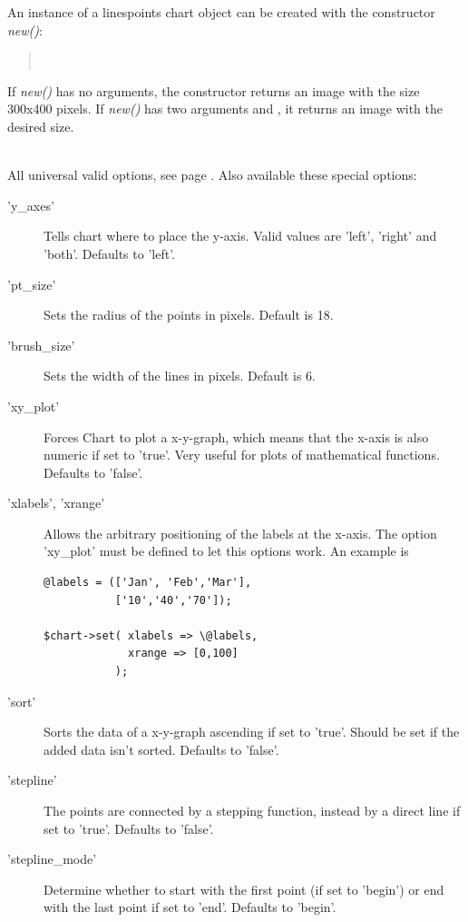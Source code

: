 \begin{Constructor} 
An instance of a linespoints chart object can be created with the constructor 
\textit{new()}:
\begin{quote}
\parindent 0pt
\\
\end{quote}

If \textit{new()} has no arguments, the constructor returns an image with the size 300x400 pixels.
If \textit{new()} has two arguments  and , 
it returns an image with the desired size.
\end{Constructor}

\Methods
{} \\[\parabstand]
%
\Attributes
All universal valid options, see page \pageref{options}. 
Also available these special options:
\begin{description}
\item['y\_axes'] Tells chart where to place the y-axis. 
     Valid values are 'left', 'right' and 'both'. Defaults to 'left'.

\item['pt\_size'] Sets the radius of the points in pixels. Default is 18.

\item['brush\_size'] Sets the width of the lines in pixels. Default is 6.

\item['xy\_plot'] Forces Chart to plot a x-y-graph, 
                  which means that the x-axis is also numeric if set to 'true'. 
                  Very useful for plots of mathematical functions. Defaults to 'false'.

\item['xlabels', 'xrange'] Allows the arbitrary positioning of the labels at the
                  x-axis. The option 'xy\_plot' must be defined to let this
                  options work. An example is
                  \begin{verbatim}
@labels = (['Jan', 'Feb','Mar'], 
           ['10','40','70']); 

$chart->set( xlabels => \@labels, 
             xrange => [0,100] 
           ); 
                   \end{verbatim}

\item['sort'] Sorts the data of a x-y-graph ascending if set to 'true'. 
              Should be set if the added data isn't sorted. Defaults to 'false'.  
              
\item['stepline'] The points are connected by a stepping function,
                  instead by a direct line if set to 'true'. 
                  Defaults to 'false'.   

\item['stepline\_mode'] Determine whether to start with the first point
                    (if set to 'begin') or end with the last point if set to 'end'.
                    Defaults to 'begin'.   
\end{description}
